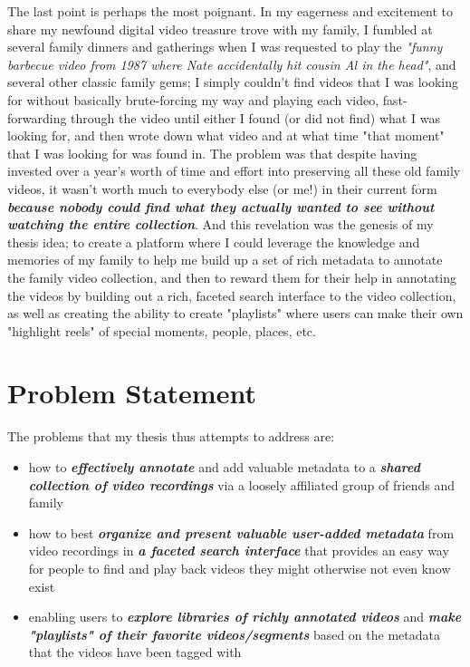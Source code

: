 The last point is perhaps the most poignant. In my eagerness and excitement to share my newfound digital video treasure trove with my family, I fumbled at several family dinners and gatherings when I was requested to play the \textit{"funny barbecue video from 1987 where Nate accidentally hit cousin Al in the head"}, and several other classic family gems; I simply couldn't find videos that I was looking for without basically brute-forcing my way and playing each video, fast-forwarding through the video until either I found (or did not find) what I was looking for, and then wrote down what video and at what time "that moment" that I was looking for was found in.  The problem was that despite having invested over a year's worth of time and effort into preserving all these old family videos, it wasn't worth much to everybody else (or me!) in their current form \textit{\textbf{because nobody could find what they actually wanted to see without watching the entire collection}}.  And this revelation was the genesis of my thesis idea; to create a platform where I could leverage the knowledge and memories of my family to help me build up a set of rich metadata to annotate the family video collection, and then to reward them for their help in annotating the videos by building out a rich, faceted search interface to the video collection, as well as creating the ability to create "playlists" where users can make their own "highlight reels" of special moments, people, places, etc.



\section{Problem Statement}
\label{sec:problem-statement:description}

The problems that my thesis thus attempts to address are:

\begin{itemize}[noitemsep]
\item how to \textbf{\textit{effectively annotate}} and add valuable metadata to a \textbf{\textit{shared collection of video recordings}} via a loosely affiliated group of friends and family
\item how to best \textbf{\textit{organize and present valuable user-added metadata}} from video recordings in \textbf{\textit{a faceted search interface}} that provides an easy way for people to find and play back videos they might otherwise not even know exist
\item enabling users to \textbf{\textit{explore libraries of richly annotated videos}} and \textbf{\textit{make "playlists" of their favorite videos/segments}} based on the metadata that the videos have been tagged with
\end{itemize}

